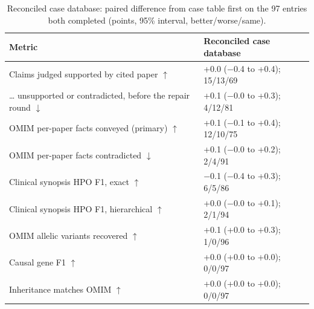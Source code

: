 \documentclass{article} %
\begin{document}
\begin{table}[!htb]
\caption{Reconciled case database: paired difference from case table first on the 97 entries both completed (points, 95\% interval, better/worse/same).}
\label{tab:app_recon}
\scriptsize
\begin{tabularx}{\linewidth}{>{\raggedright\arraybackslash}p{5.6cm}>{\centering\arraybackslash}X}
\toprule
Metric & Reconciled case database \\
\midrule
Claims judged supported by cited paper $\uparrow$ & +0.0 ($-$0.4 to +0.4); 15/13/69 \\
\ldots{} unsupported or contradicted, before the repair round $\downarrow$ & +0.1 ($-$0.0 to +0.3); 4/12/81 \\
OMIM per-paper facts conveyed (primary) $\uparrow$ & +0.1 ($-$0.1 to +0.4); 12/10/75 \\
OMIM per-paper facts contradicted $\downarrow$ & +0.1 ($-$0.0 to +0.2); 2/4/91 \\
Clinical synopsis HPO F1, exact $\uparrow$ & $-$0.1 ($-$0.4 to +0.3); 6/5/86 \\
Clinical synopsis HPO F1, hierarchical $\uparrow$ & +0.0 ($-$0.0 to +0.1); 2/1/94 \\
OMIM allelic variants recovered $\uparrow$ & +0.1 (+0.0 to +0.3); 1/0/96 \\
Causal gene F1 $\uparrow$ & +0.0 (+0.0 to +0.0); 0/0/97 \\
Inheritance matches OMIM $\uparrow$ & +0.0 (+0.0 to +0.0); 0/0/97 \\
\bottomrule
\end{tabularx}
\end{table}
\end{document}
